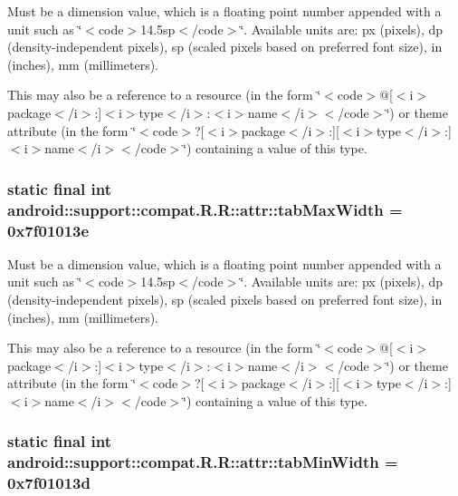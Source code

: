 Must be a dimension value, which is a floating point number appended with a unit such as \char`\"{}$<$code$>$14.5sp$<$/code$>$\char`\"{}. Available units are: px (pixels), dp (density-independent pixels), sp (scaled pixels based on preferred font size), in (inches), mm (millimeters). 

This may also be a reference to a resource (in the form \char`\"{}$<$code$>$@\mbox{[}$<$i$>$package$<$/i$>$:\mbox{]}$<$i$>$type$<$/i$>$:$<$i$>$name$<$/i$>$$<$/code$>$\char`\"{}) or theme attribute (in the form \char`\"{}$<$code$>$?\mbox{[}$<$i$>$package$<$/i$>$:\mbox{]}\mbox{[}$<$i$>$type$<$/i$>$:\mbox{]}$<$i$>$name$<$/i$>$$<$/code$>$\char`\"{}) containing a value of this type. \hypertarget{classandroid_1_1support_1_1compat_1_1_r_1_1attr_311b23525bed60e60a153996f127652a}{
\subsubsection[{tabMaxWidth}]{\setlength{\rightskip}{0pt plus 5cm}static final int android::support::compat.R.R::attr::tabMaxWidth = 0x7f01013e}}
\label{classandroid_1_1support_1_1compat_1_1_r_1_1attr_311b23525bed60e60a153996f127652a}


Must be a dimension value, which is a floating point number appended with a unit such as \char`\"{}$<$code$>$14.5sp$<$/code$>$\char`\"{}. Available units are: px (pixels), dp (density-independent pixels), sp (scaled pixels based on preferred font size), in (inches), mm (millimeters). 

This may also be a reference to a resource (in the form \char`\"{}$<$code$>$@\mbox{[}$<$i$>$package$<$/i$>$:\mbox{]}$<$i$>$type$<$/i$>$:$<$i$>$name$<$/i$>$$<$/code$>$\char`\"{}) or theme attribute (in the form \char`\"{}$<$code$>$?\mbox{[}$<$i$>$package$<$/i$>$:\mbox{]}\mbox{[}$<$i$>$type$<$/i$>$:\mbox{]}$<$i$>$name$<$/i$>$$<$/code$>$\char`\"{}) containing a value of this type. \hypertarget{classandroid_1_1support_1_1compat_1_1_r_1_1attr_c062b36a58bfe3577eb343df24b3e3db}{
\subsubsection[{tabMinWidth}]{\setlength{\rightskip}{0pt plus 5cm}static final int android::support::compat.R.R::attr::tabMinWidth = 0x7f01013d}}
\label{classandroid_1_1support_1_1compat_1_1_r_1_1attr_c062b36a58bfe3577eb343df24b3e3db}


